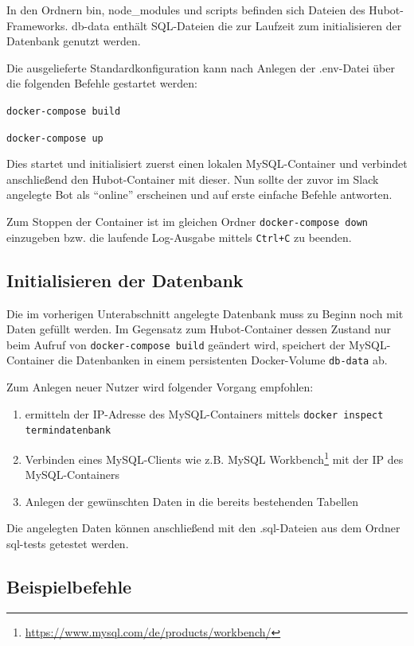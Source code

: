 In den Ordnern bin, node\_modules und scripts befinden sich Dateien des Hubot-Frameworks. db-data enthält SQL-Dateien die zur Laufzeit zum initialisieren der Datenbank genutzt werden.

Die ausgelieferte Standardkonfiguration kann nach Anlegen der .env-Datei über die folgenden Befehle gestartet werden:

\texttt{docker-compose build}

\texttt{docker-compose up}

Dies startet und initialisiert zuerst einen lokalen MySQL-Container und verbindet anschließend den Hubot-Container mit dieser. Nun sollte der zuvor im Slack angelegte Bot als \enquote{online} erscheinen und auf erste einfache Befehle antworten.

Zum Stoppen der Container ist im gleichen Ordner \texttt{docker-compose down} einzugeben bzw. die laufende Log-Ausgabe mittels \texttt{Ctrl+C} zu beenden.

\subsection{Initialisieren der Datenbank}
Die im vorherigen Unterabschnitt angelegte Datenbank muss zu Beginn noch mit Daten gefüllt werden. Im Gegensatz zum Hubot-Container dessen Zustand nur beim Aufruf von \texttt{docker-compose build} geändert wird, speichert der MySQL-Container die Datenbanken in einem persistenten Docker-Volume \texttt{db-data} ab.

Zum Anlegen neuer Nutzer wird folgender Vorgang empfohlen:

\begin{enumerate}
    \item ermitteln der IP-Adresse des MySQL-Containers mittels \texttt{docker inspect termindatenbank}
    \item Verbinden eines MySQL-Clients wie z.B. MySQL Workbench\footnote{\url{https://www.mysql.com/de/products/workbench/}} mit der IP des MySQL-Containers
    \item Anlegen der gewünschten Daten in die bereits bestehenden Tabellen
\end{enumerate}

Die angelegten Daten können anschließend mit den .sql-Dateien aus dem Ordner sql-tests getestet werden.

\subsection{Beispielbefehle}

